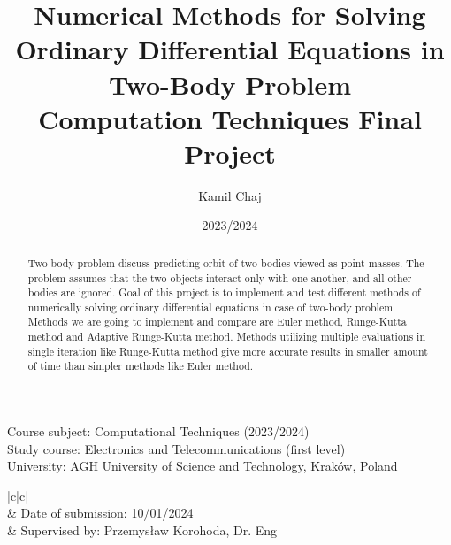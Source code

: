 \documentclass[english,12pt,a4paper, notitlepage]{report}
\title{Numerical Methods for Solving Ordinary Differential Equations in Two-Body Problem\\
	\normalsize Computation Techniques Final Project}
\author{Kamil Chaj}
\date{2023/2024}
\begin{document}
	\begin{titlepage}
		\noindent
		Course subject: Computational Techniques (2023/2024) \\
		Study course: Electronics and Telecommunications (first level) \\
		University: AGH University of Science and Technology, Kraków, Poland \\
				
		\begin{center}
			\vspace{0.2cm}	
			\begin{tabular}{|c|c|}
				\hline
				  \\
				\hline
				& Date of submission: 10/01/2024 \\
				
				& Supervised by: Przemysław Korohoda, Dr. Eng \\
				\hline
			\end{tabular}

			\vspace*{-1cm}
%
%			
%						
%			
%			
%			
%			

			\vfill
			
			\begin{abstract}
				Two-body problem discuss predicting orbit of two bodies viewed as point masses. The problem assumes that the two objects interact only with one another, and all other bodies are ignored. Goal of this project is to implement and test different methods of numerically solving ordinary differential equations in case of two-body problem. Methods we are going to implement and compare are  Euler method, Runge-Kutta method and Adaptive Runge-Kutta method. 
				Methods utilizing multiple evaluations in single iteration like Runge-Kutta method give more accurate results in smaller amount of time than simpler methods like Euler method.
			\end{abstract}
						
			\vfill
									
			
		\end{center}
	\end{titlepage}
\end{document}
